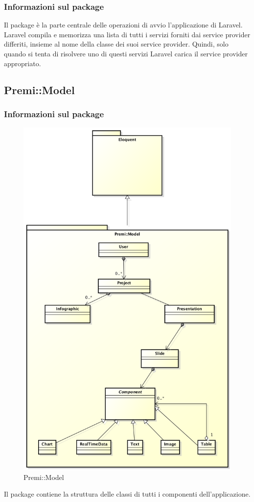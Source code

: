 \subsubsection*{Informazioni sul package}
Il package è la parte centrale delle operazioni di avvio l'applicazione di \gls{Laravel}. \gls{Laravel} compila e memorizza una lista di tutti i servizi forniti dai service provider differiti, insieme al nome della classe dei suoi service provider. Quindi, solo quando si tenta di risolvere uno di questi servizi \gls{Laravel} carica il service provider appropriato.


\newpage
\subsection{Premi::Model}
	\subsubsection*{Informazioni sul package}
\begin{figure}[h]
\centering
\includegraphics[width=0.7\linewidth]{img/premi_http_model}
\caption[Premi::Model]{Premi::Model}
\label{fig:premi_http_model}
\end{figure}
		Il package contiene la struttura delle classi di tutti i componenti dell'applicazione.
		
